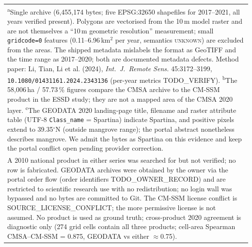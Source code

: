\begin{table}
\begin{tabular}{p{0.9cm}p{1.75cm}p{1.2cm}p{1.7cm}p{2.55cm}p{2.7cm}p{1.75cm}p{1.7cm}p{1.95cm}p{1.7cm}p{1.7cm}p{1.85cm}}
\bottomrule
\multicolumn{12}{p{24cm}}{\footnotesize
\textsuperscript{a}Single archive (6{,}455{,}174 bytes; five EPSG:32650
shapefiles for 2017--2021, all years verified present). Polygons are
vectorised from the 10\,m model raster and are not themselves a ``10\,m
geometric resolution'' measurement; small \texttt{gridcode=0} features
(0.11--6.96\,km$^2$ per year, semantics \textsc{unknown}) are excluded
from the areas. The shipped metadata mislabels the format as GeoTIFF
and the time range as 2017--2020; both are documented metadata defects.
Method paper: Li, Tian, Li et al. (2024), \emph{Int.\ J.\ Remote Sens.}
45:3172--3199, \nolinkurl{10.1080/01431161.2024.2343136} (per-year
metrics TODO\_VERIFY).\quad
\textsuperscript{b}The 58{,}006\,ha / 57.73\,\% figures compare the CMSA
archive to the CM-SSM product in the ESSD study; they are not a mapped
area of the CMSA 2020 layer.\quad
\textsuperscript{c}The GEODATA 2020 landing-page title, filename and
raster attribute table (UTF-8 \texttt{Class\_name} = Spartina) indicate
Spartina, and positive pixels extend to 39.35$^{\circ}$N (outside
mangrove range); the portal abstract nonetheless describes mangrove.
We admit the bytes as Spartina on this evidence and keep the portal
conflict open pending provider correction.}\\
\multicolumn{12}{p{24cm}}{\footnotesize
A 2010 national product in either series was searched for but not
verified; no row is fabricated. GEODATA archives were obtained by the
owner via the portal order flow (order identifiers TODO\_OWNER\_RECORD)
and are restricted to scientific research use with no redistribution;
no login wall was bypassed and no bytes are committed to Git. The
CM-SSM license conflict is SOURCE\_LICENSE\_CONFLICT; the more
permissive license is not assumed. No product is used as ground truth;
cross-product 2020 agreement is diagnostic only (274 grid cells contain
all three products; cell-area Spearman CMSA--CM-SSM = 0.875,
GEODATA vs either $\approx$0.75).}
\end{tabular}
\end{table}
